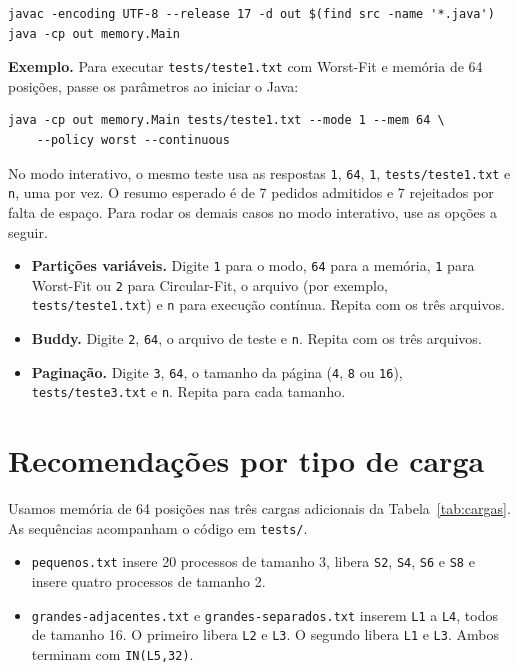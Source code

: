 \documentclass[11pt,a4paper]{article}
\newcommand{\arquivo}[1]{\texttt{#1}}
\begin{document}
\begin{verbatim}
javac -encoding UTF-8 --release 17 -d out $(find src -name '*.java')
java -cp out memory.Main
\end{verbatim}

\textbf{Exemplo.} Para executar \arquivo{tests/teste1.txt} com Worst-Fit e
memória de 64 posições, passe os parâmetros ao iniciar o Java:

\begin{verbatim}
java -cp out memory.Main tests/teste1.txt --mode 1 --mem 64 \
    --policy worst --continuous
\end{verbatim}

No modo interativo, o mesmo teste usa as respostas \arquivo{1},
\arquivo{64}, \arquivo{1}, \arquivo{tests/teste1.txt} e \arquivo{n},
uma por vez. O resumo esperado é de 7 pedidos admitidos e 7 rejeitados
por falta de espaço. Para rodar os demais casos no modo interativo,
use as opções a seguir.

\begin{itemize}
    \item \textbf{Partições variáveis.} Digite \arquivo{1} para o modo,
    \arquivo{64} para a memória, \arquivo{1} para Worst-Fit ou \arquivo{2}
    para Circular-Fit, o arquivo (por exemplo, \arquivo{tests/teste1.txt})
    e \arquivo{n} para execução contínua. Repita com os três arquivos.
    \item \textbf{Buddy.} Digite \arquivo{2}, \arquivo{64}, o arquivo
    de teste e \arquivo{n}. Repita com os três arquivos.
    \item \textbf{Paginação.} Digite \arquivo{3}, \arquivo{64}, o tamanho
    da página (\arquivo{4}, \arquivo{8} ou \arquivo{16}),
    \arquivo{tests/teste3.txt} e \arquivo{n}. Repita para cada tamanho.
\end{itemize}

\clearpage

\section{Recomendações por tipo de carga}

Usamos memória de 64 posições nas três cargas adicionais da
Tabela~\ref{tab:cargas}. As sequências acompanham o código em
\arquivo{tests/}.

\begin{itemize}
    \item \arquivo{pequenos.txt} insere 20 processos de tamanho 3, libera
    \arquivo{S2}, \arquivo{S4}, \arquivo{S6} e \arquivo{S8} e insere quatro
    processos de tamanho 2.
    \item \arquivo{grandes-adjacentes.txt} e \arquivo{grandes-separados.txt}
    inserem \arquivo{L1} a \arquivo{L4}, todos de tamanho 16. O primeiro
    libera \arquivo{L2} e \arquivo{L3}. O segundo libera \arquivo{L1} e
    \arquivo{L3}. Ambos terminam com \arquivo{IN(L5,32)}.
\end{itemize}
\end{document}
